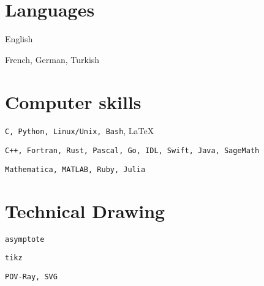 \documentclass[a4paper,sans]{moderncv}
\begin{document}
    \section{Languages}
         English\par
         French, German, Turkish
    \section{Computer skills}
        \texttt{C, Python, Linux/Unix, Bash}, \LaTeX\par
        \texttt{C++, Fortran, Rust, Pascal, Go, IDL, Swift, Java, SageMath}\par
        \texttt{Mathematica, MATLAB, Ruby, Julia}
    \section{Technical Drawing}
        \texttt{asymptote}\par
        \texttt{tikz}\par
        \texttt{POV-Ray, SVG}
\end{document}
